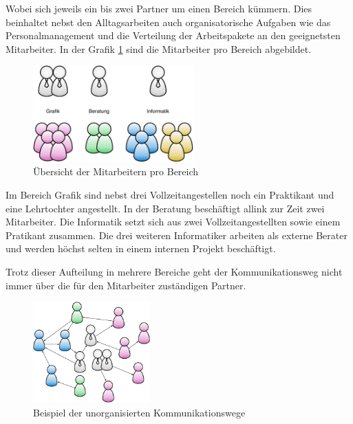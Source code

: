 Wobei sich jeweils ein bis zwei Partner um einen
Bereich kümmern. Dies beinhaltet nebst den Alltagsarbeiten auch organisatorische 
Aufgaben wie das Personalmanagement und die Verteilung der Arbeitspakete an den 
geeignetsten Mitarbeiter. In der Grafik \ref{pic:mitarbeiter_pro_bereich} 
sind die Mitarbeiter pro Bereich abgebildet.

\begin{figure}[htbp]
\begin{center}
\includegraphics[width=0.55\textwidth,angle=0]{./bilder/analyse/mitarbeiter_pro_bereich.pdf}
\caption[]{Übersicht der Mitarbeitern pro Bereich\footnotemark}
\label{pic:mitarbeiter_pro_bereich}
\end{center}
\end{figure}

Im Bereich Grafik sind nebst drei Vollzeitangestellen noch ein Praktikant und eine
Lehrtochter angestellt. In der Beratung beschäftigt allink zur Zeit zwei Mitarbeiter.
Die Informatik setzt sich aus zwei Vollzeitangestellten sowie einem Pratikant
zusammen. Die drei weiteren Informatiker arbeiten als externe Berater und
werden höchst selten in einem internen Projekt beschäftigt.

Trotz dieser Aufteilung in mehrere Bereiche geht der Kommunikationsweg nicht
immer über die für den Mitarbeiter zuständigen Partner. 

\begin{figure}[htbp]
\begin{center}
\includegraphics[width=0.40\textwidth,angle=0]{./bilder/analyse/kommunikationswege.pdf}
\caption{Beispiel der unorganisierten Kommunikationswege}
\label{pic:kommunikationswege}
\end{center}
\end{figure}

